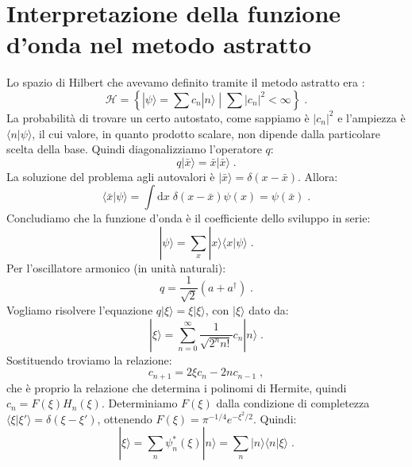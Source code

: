 \documentclass[10pt,a4paper]{report}
\theoremstyle{definition}
\newcommand{\ham}{\mathcal{H}}
\numberwithin{equation}{section}
\newcommand{\diff}[1][]{\mathrm{d}#1}
\newcommand{\bra}{\langle}
\newcommand{\ket}{\rangle}
\newcommand{\adj}[1]{#1^{\dagger}}
\begin{document}
\section{Interpretazione della funzione d'onda nel metodo astratto}
Lo spazio di Hilbert che avevamo definito tramite il metodo astratto era :
\begin{equation}
\ham =\left\{\left.|\psi\ket=\sum c_n|n\ket\;\right|\; \sum |c_n|^2<\infty\right\}\;.
\end{equation}
La probabilità di trovare un certo autostato, come sappiamo è $|c_n|^2$ e l'ampiezza è $\bra n|\psi\ket$, il cui valore, in quanto prodotto scalare, non dipende dalla particolare scelta della base. Quindi diagonalizziamo l'operatore $q$:
\begin{equation}
q|\bar{x}\ket=\bar{x}|\bar{x}\ket\;.
\end{equation}
La soluzione del problema agli autovalori è $|\bar{x}\ket=\delta(x-\bar{x})$. Allora:
$$
\bra\bar{x}|\psi\ket=\int\diff{x}\; \delta(x-\bar{x})\psi(x)=\psi(\bar{x})\;.
$$
Concludiamo che la funzione d'onda è il coefficiente dello sviluppo in serie:
\begin{equation}
|\psi\ket=\sum_x |x\ket\bra x|\psi\ket\;.
\end{equation}
Per l'oscillatore armonico (in unità naturali):
$$
q=\frac{1}{\sqrt{2}}(a+\adj{a})\;.
$$
Vogliamo risolvere l'equazione $q|\xi\ket=\xi|\xi\ket$, con $|\xi\ket$ dato da:
\begin{equation}
|\xi\ket=\sum_{n=0}^{\infty} \frac{1}{\sqrt{2^n n!}}c_n|n\ket\;.
\end{equation}
Sostituendo troviamo la relazione:
\begin{equation}
c_{n+1}=2\xi c_n-2nc_{n-1}\;,
\end{equation}
che è proprio la relazione che determina i polinomi di Hermite, quindi $c_n=F(\xi)H_n(\xi)$. Determiniamo $F(\xi)$ dalla condizione di completezza $\bra\xi|\xi'\ket=\delta(\xi-\xi')$, ottenendo $F(\xi)=\pi^{-1/4}e^{-\xi^2/2}$. Quindi:
\begin{equation}
|\xi\ket=\sum_n \psi^*_n(\xi)|n\ket=\sum_n |n\ket\bra n|\xi\ket\;.
\end{equation}
\end{document}
